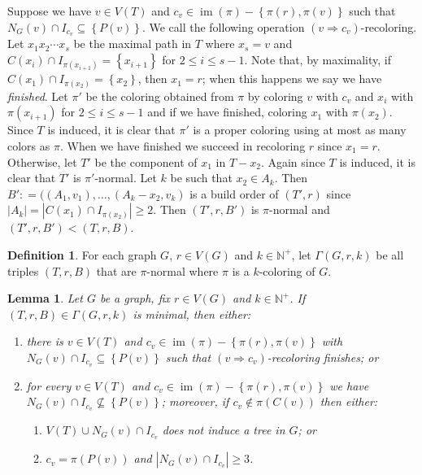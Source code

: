 \documentclass[12pt]{article}
\theoremstyle{plain}
\newtheorem{lem}[thm]{Lemma}
\theoremstyle{definition}
\newtheorem{defn}{Definition}
\theoremstyle{remark}
\newcommand{\IN}{\mathbb{N}}
\newcommand{\set}[1]{\left\{ #1 \right\}}
\newcommand{\card}[1]{\left|#1\right|}
\newcommand{\DefinedAs}{\mathrel{\mathop:}=}
\newcommand{\im}{\operatorname{im}}
\begin{document}
Suppose we have $v \in V(T)$ and $c_v \in \im(\pi) - \set{\pi(r), \pi(v)}$ such that $N_G(v) \cap I_{c_v} \subseteq \set{P(v)}$.  We call the following operation $(v\Rightarrow c_v)$-recoloring. Let $x_1x_2\cdots x_s$ be the maximal path in $T$ where $x_s = v$ and $C(x_i) \cap I_{\pi(x_{i+1})} = \set{x_{i+1}}$ for $2 \leq i \leq s-1$.  Note that, by maximality, if $C(x_1) \cap I_{\pi(x_{2})} = \set{x_{2}}$, then $x_1 = r$; when this happens we say we have \emph{finished}.  Let $\pi'$ be the coloring obtained from $\pi$ by coloring $v$ with $c_v$ and $x_i$ with $\pi(x_{i+1})$ for $2 \leq i \leq s-1$ and if we have finished, coloring $x_1$ with $\pi(x_2)$.  Since $T$ is induced, it is clear that $\pi'$ is a proper coloring using at most as many colors as $\pi$.  When we have finished we succeed in recoloring $r$ since $x_1=r$.  Otherwise, let $T'$ be the component of $x_1$ in $T-x_2$.  Again since $T$ is induced, it is clear that $T'$ is $\pi'$-normal.  Let $k$ be such that $x_2 \in A_k$.  Then $B'\DefinedAs ((A_1, v_1),\ldots, (A_k-x_2, v_k)$ is a build order of $(T', r)$ since $\card{A_k} = \card{C(x_1) \cap I_{\pi(x_{2})}} \geq 2$.  Then $(T', r, B')$ is $\pi$-normal and $(T', r, B') < (T, r, B)$.

\begin{defn}
For each graph $G$, $r \in V(G)$ and $k \in \IN^+$, let $\Gamma(G,r,k)$ be all triples $(T,r,B)$ that are $\pi$-normal where $\pi$ is a $k$-coloring of $G$.
\end{defn}

\begin{lem}
Let $G$ be a graph, fix $r \in V(G)$ and $k \in \IN^+$. If $(T, r, B) \in \Gamma(G,r,k)$ is minimal, then either:
\begin{enumerate}
\item there is $v \in V(T)$ and $c_v \in \im(\pi) - \set{\pi(r), \pi(v)}$ with $N_G(v) \cap I_{c_v} \subseteq \set{P(v)}$ such that $(v\Rightarrow c_v)$-recoloring finishes; or 
\item for every $v \in V(T)$ and $c_v \in \im(\pi) - \set{\pi(r), \pi(v)}$ we have $N_G(v) \cap I_{c_v} \not \subseteq \set{P(v)}$; moreover, if $c_v \not \in \pi(C(v))$ then either:
	\begin{enumerate}
	\item $V(T) \cup N_G(v) \cap I_{c_v}$ does not induce a tree in $G$; or
	\item $c_v = \pi(P(v))$ and $\card{N_G(v) \cap I_{c_v}} \geq 3$.
	\end{enumerate} 
\end{enumerate}
\end{lem}



\end{document}
